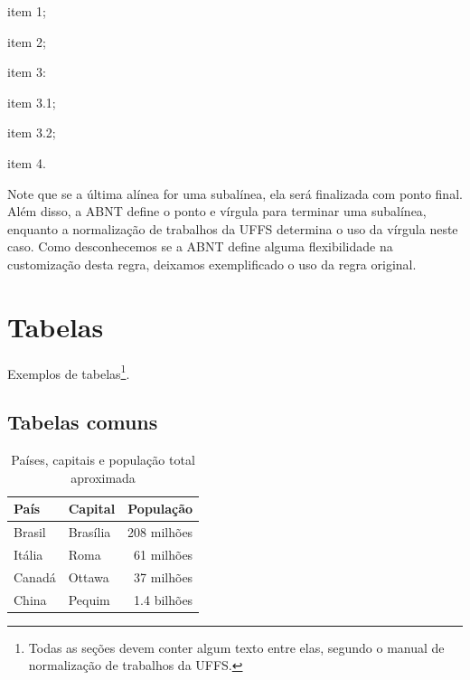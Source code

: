 \documentclass[serif, brazilian]{uffstex}
\begin{document}
\begin{alineas}
  \item item 1;
  \item item 2;
  \item item 3:
  \begin{alineas} %
    \item item 3.1;
    \item item 3.2;
  \end{alineas}
  \item item 4.
\end{alineas}

Note que se a última alínea for uma subalínea, ela será finalizada com ponto final. Além disso, a ABNT define o ponto e vírgula para terminar uma subalínea, enquanto a normalização de trabalhos da UFFS determina o uso da vírgula neste caso. Como desconhecemos se a ABNT define alguma flexibilidade na customização desta regra, deixamos exemplificado o uso da regra original.

\chapter{Tabelas}

Exemplos de tabelas\footnote{Todas as seções devem conter algum texto entre elas, segundo o manual de normalização de trabalhos da UFFS.}.

\section{Tabelas comuns}

\begin{table}[h]
  \centering
  \caption{Países, capitais e população total aproximada}%
  \label{tab:paises}
  \begin{tabular}{@{}llr@{}}
    \toprule %
    País   & Capital  & População\footnotemark\\
    \midrule %
    Brasil & Brasília & 208 milhões\\
    Itália & Roma     & 61 milhões\\
    Canadá & Ottawa   & 37 milhões\\
    China  & Pequim   & 1.4 bilhões\\
    \bottomrule %
  \end{tabular}
\end{table}
\end{document}
